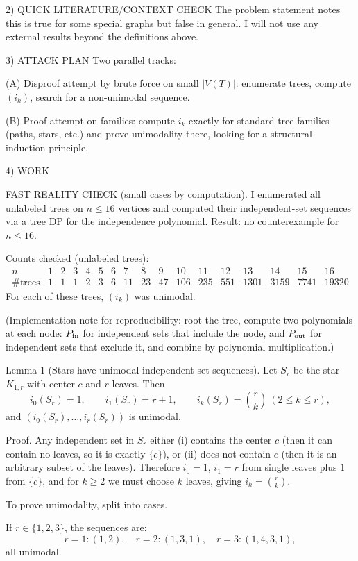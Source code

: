 2) QUICK LITERATURE/CONTEXT CHECK
The problem statement notes this is true for some special graphs but false in general.  I will not use any external results beyond the definitions above.

3) ATTACK PLAN
Two parallel tracks:

(A) Disproof attempt by brute force on small $|V(T)|$: enumerate trees, compute $(i_k)$, search for a non-unimodal sequence.

(B) Proof attempt on families: compute $i_k$ exactly for standard tree families (paths, stars, etc.) and prove unimodality there, looking for a structural induction principle.

4) WORK

FAST REALITY CHECK (small cases by computation).
I enumerated all unlabeled trees on $n\le 16$ vertices and computed their independent-set sequences via a tree DP for the independence polynomial.  Result: no counterexample for $n\le 16$.

Counts checked (unlabeled trees):
\[
\begin{array}{c|cccccccccccccccc}
 n & 1&2&3&4&5&6&7&8&9&10&11&12&13&14&15&16\\\hline
 \#\text{trees} & 1&1&1&2&3&6&11&23&47&106&235&551&1301&3159&7741&19320
\end{array}
\]
For each of these trees, $(i_k)$ was unimodal.

(Implementation note for reproducibility: root the tree, compute two polynomials at each node: $P_{\rm in}$ for independent sets that include the node, and $P_{\rm out}$ for independent sets that exclude it, and combine by polynomial multiplication.)

Lemma 1 (Stars have unimodal independent-set sequences).
Let $S_r$ be the star $K_{1,r}$ with center $c$ and $r$ leaves.  Then
\[
 i_0(S_r)=1,\qquad i_1(S_r)=r+1,\qquad i_k(S_r)=\binom{r}{k}\ (2\le k\le r),
\]
and $(i_0(S_r),\dots,i_r(S_r))$ is unimodal.

Proof.
Any independent set in $S_r$ either (i) contains the center $c$ (then it can contain no leaves, so it is exactly $\{c\}$), or (ii) does not contain $c$ (then it is an arbitrary subset of the leaves).  Therefore $i_0=1$, $i_1=r$ from single leaves plus $1$ from $\{c\}$, and for $k\ge 2$ we must choose $k$ leaves, giving $i_k=\binom{r}{k}$.

To prove unimodality, split into cases.

If $r\in\{1,2,3\}$, the sequences are:
\[
 r=1: (1,2),\quad r=2:(1,3,1),\quad r=3:(1,4,3,1),
\]
all unimodal.

